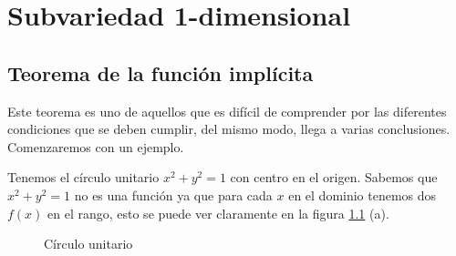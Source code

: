 \chapter{Subvariedad 1-dimensional}
\section{Teorema de la funci\'on impl\'icita}
Este teorema es uno de aquellos que es dif\'icil de comprender por las
diferentes condiciones que se deben cumplir, del mismo modo, llega a 
varias conclusiones. Comenzaremos con un ejemplo.

\begin{example}\label{ex:unit-circle}
    Tenemos el c\'irculo unitario $x^{2} + y^{2} = 1$ con centro en el
    origen. Sabemos que  $x^{2} + y^{2} = 1$ no es una funci\'on ya que
    para cada $x$ en el dominio tenemos dos $f(x)$ en el rango, esto se
    puede ver claramente en la figura \ref{fig:unit-circle12} (a). 

    \begin{figure}[!ht]%
        \centering
        \label{fig:unit-circle123}
        \qquad
        \caption{C\'irculo unitario}
        \label{fig:unit-circle12}
    \end{figure}



\end{example}
